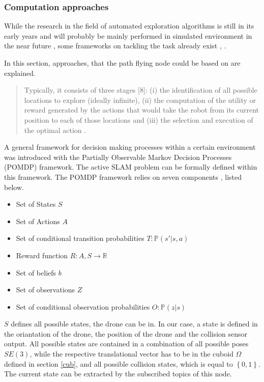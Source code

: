 	\subsubsection{Computation approaches}
	
	While the research in the field of automated exploration algorithms is still in its early years \cite{early} and will probably be mainly performed 
	in simulated environment in the near future \cite{deep}, some frameworks on tackling the 
	task already exist \cite{early}, \cite{deep} \cite{accurat} \cite{lopez}. 
	
	In this section, approaches, that the path flying node could be based on are explained. 
	
	\begin{quote}
	Typically, it consists of three stages [8]: (i) the identification of all possible locations
to explore (ideally infinite), (ii) the computation of the utility or reward generated by the actions that
would take the robot from its current position to each of those locations and (iii) the selection and
execution of the optimal action \cite{deep}. 
\end{quote}

A general framework for decision making processes within a certain environment was introduced with the Partially Observable Markov Decision Processes (POMDP) framework. 
	The active SLAM problem can be formally defined within this framework. 
	The POMDP framework relies on seven components \cite{thesisvandenhof}, listed below. 
	
	\begin{itemize}
	\item{Set of States $S$}
	\item{Set of Actions $A$}
	\item{Set of conditional transition probabilities $T: \mathbb{P}(s'|s, a)$}
	\item{Reward function $R : A, S \rightarrow \mathbb{R}$}
	\item{Set of beliefs $b$}
	\item{Set of observations $Z$}
	\item{Set of conditional observation probabilities $O: \mathbb{P}(z|s)$}
	\end{itemize}
	
	$S$ defines all possible states, the drone can be in. In our case, a state is defined in the oriantation of the drone, the position of the drone and the collision sensor output.
	All possible states are contained in a combination of all possible poses $SE(3)$, while the respective translational vector has to be in the cuboid $\Omega$ defined in section \ref{cub},  
	and all possible collision states, which is equal to $\left\{0,1\right\}$. The current state can be extracted by the subscribed topics of this node. 
	
